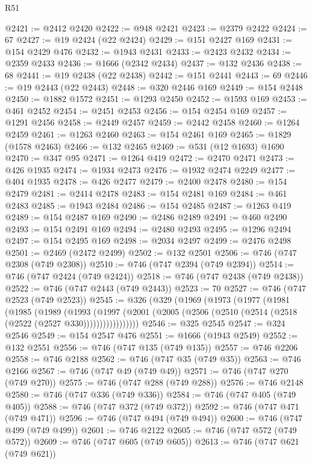\begin{lexlean}{R51}
\begin{coremodule}
@2421 := @2412 @2420
@2422 := @948 @2421
@2423 := @2379 @2422
@2424 := 67
@2427 := @19 @2424 (@22 @2424)
@2429 := @151 @2427 @169
@2431 := @154 @2429 @476
@2432 := @1943 @2431
@2433 := @2423 @2432
@2434 := @2359 @2433
@2436 := @1666 (@2342 @2434)
@2437 := @132 @2436
@2438 := 68
@2441 := @19 @2438 (@22 @2438)
@2442 := @151 @2441
@2443 := 69
@2446 := @19 @2443 (@22 @2443)
@2448 := @320 @2446 @169
@2449 := @154 @2448
@2450 := @1882 @1572
@2451 := @1293 @2450
@2452 := @1593 @169
@2453 := @461 @2452
@2454 := @2451 @2453
@2456 := @154 @2454 @169
@2457 := @1291 @2456
@2458 := @2449 @2457
@2459 := @2442 @2458
@2460 := @1264 @2459
@2461 := @1263 @2460
@2463 := @154 @2461 @169
@2465 := @1829 (@1578 @2463)
@2466 := @132 @2465
@2469 := @531 (@12 @1693) @1690
@2470 := @347 @95
@2471 := @1264 @419
@2472 := @2470 @2471
@2473 := @426 @1935
@2474 := @1934 @2473
@2476 := @1932 @2474 @2249
@2477 := @404 @1935
@2478 := @426 @2477
@2479 := @2400 @2478
@2480 := @154 @2479
@2481 := @2414 @2478
@2483 := @154 @2481 @169
@2484 := @461 @2483
@2485 := @1943 @2484
@2486 := @154 @2485
@2487 := @1263 @419
@2489 := @154 @2487 @169
@2490 := @2486 @2489
@2491 := @460 @2490
@2493 := @154 @2491 @169
@2494 := @2480 @2493
@2495 := @1296 @2494
@2497 := @154 @2495 @169
@2498 := @2034 @2497
@2499 := @2476 @2498
@2501 := @2469 (@2472 @2499)
@2502 := @132 @2501
@2506 := @746 (@747 @2308 (@749 @2308))
@2510 := @746 (@747 @2394 (@749 @2394))
@2514 := @746 (@747 @2424 (@749 @2424))
@2518 := @746 (@747 @2438 (@749 @2438))
@2522 := @746 (@747 @2443 (@749 @2443))
@2523 := 70
@2527 := @746 (@747 @2523 (@749 @2523))
@2545 := @326
    (@329
      (@1969
        (@1973
          (@1977
            (@1981
              (@1985
                (@1989
                  (@1993
                    (@1997
                      (@2001 (@2005 (@2506 (@2510 (@2514 (@2518 (@2522 (@2527 @330)))))))))))))))))
@2546 := @325 @2545
@2547 := @324 @2546
@2549 := @154 @2547 @476
@2551 := @1666 (@1943 @2549)
@2552 := @132 @2551
@2556 := @746 (@747 @135 (@749 @135))
@2557 := @746 @2206
@2558 := @746 @2188
@2562 := @746 (@747 @35 (@749 @35))
@2563 := @746 @2166
@2567 := @746 (@747 @49 (@749 @49))
@2571 := @746 (@747 @270 (@749 @270))
@2575 := @746 (@747 @288 (@749 @288))
@2576 := @746 @2148
@2580 := @746 (@747 @336 (@749 @336))
@2584 := @746 (@747 @405 (@749 @405))
@2588 := @746 (@747 @372 (@749 @372))
@2592 := @746 (@747 @471 (@749 @471))
@2596 := @746 (@747 @494 (@749 @494))
@2600 := @746 (@747 @499 (@749 @499))
@2601 := @746 @2122
@2605 := @746 (@747 @572 (@749 @572))
@2609 := @746 (@747 @605 (@749 @605))
@2613 := @746 (@747 @621 (@749 @621))

\end{coremodule}
\end{lexlean}
